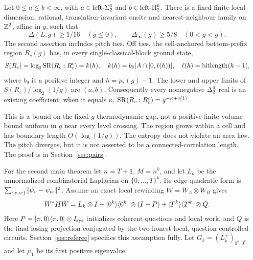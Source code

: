\begin{theorem}\label{thm:programmed}
Let $0\leq a\leq b<\infty$, with $a\in\text{left-}\Sigma^0_2$ and $b\in\text{left-}\Pi^0_2$.
There is a fixed finite-local-dimension, rational, translation-invariant
onsite and nearest-neighbour family on $\mathbb Z^2$, affine in $g$, such that
\[
 \Delta(L,g)\geq1/16\quad(g\leq0),\qquad
 \Delta_\infty(g)\geq5/8\quad(0<g<\bar g).
\]
The second assertion includes pitch ties. Off ties, the cell-anchored
bottom-prefix region $R_c(g)$ has, in every single-classical-block ground
state,
\begin{equation}\label{eq:programmed}
 S(R_c)=\log_2\operatorname{SR}(R_c:R_c^c)=k(h),\quad
 k(h)=b_0|A\cap[0,\ell(h))|,\quad
 \ell(h)=\operatorname{bitlength}(h-1),
\end{equation}
where $b_0$ is a positive integer and $h=p_*(g)-1$.
The lower and upper limits of $S(R_c)/\log_2(1/g)$ are $(a,b)$.
Consequently every nonnegative $\Delta^0_2$ real is an existing coefficient;
when it equals $\kappa$, $\operatorname{SR}(R_c:R_c^c)=g^{-\kappa+o(1)}$.
\end{theorem}

This is a bound on the fixed-$g$ thermodynamic gap, not a positive
finite-volume bound uniform in $g$ near every level crossing. The region
grows within a cell and has boundary length $O(\log(1/g))$. The entropy
does not violate an area law. The pitch diverges, but it is not asserted
to be a connected-correlation length. The proof is in
Section~\ref{sec:pairs}.

For the second main theorem let $n=T+1$, $M=n^k$, and let $L_k$ be the
unnormalized combinatorial Laplacian on $\{0,\ldots,T\}^k$.
Its edge quadratic form is $\sum_{\{v,w\}}\lVert\psi_v-\psi_w\rVert^2$.
Assume an exact local rewinding $W=W_A\otimes W_B$ gives
\begin{equation}\label{eq:cell}
 W^*HW=L_k\otimes I+\lvert0^k\rangle\langle0^k\rvert\otimes(I-P)
                    +\lvert T^k\rangle\langle T^k\rvert\otimes Q.
\end{equation}
Here $P=\lvert\pi,0\rangle\langle\pi,0\rvert\otimes I_{\rm sys}$ initializes
coherent questions and local work, and $Q$ is the final losing
projection conjugated by the two honest local, question-controlled
circuits. Section~\ref{sec:referee} specifies this assumption fully.
Let $G_k=(L_k^+)_{0^k,0^k}$ and let $\mu_1$ be its first positive
eigenvalue.

